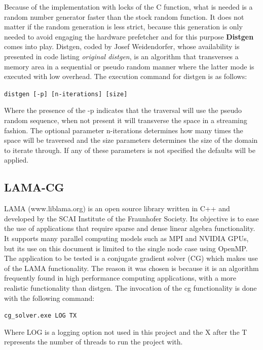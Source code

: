 Because of the implementation with locks of the C function, what is needed is a random number generator faster than the stock random function. It does not matter if the random generation is less strict, because this generation is only needed to avoid engaging the hardware prefetcher and for this purpose \textbf{Distgen} comes into play. Distgen, coded by Josef Weidendorfer, whose availability is presented in code listing \textit{original distgen}, is an algorithm that transverses a memory area in a sequential or pseudo random manner where the latter mode is executed with low overhead. The execution command for distgen is as follows:
\begin{center}
\texttt{distgen [-p] [n-iterations] [size]}
\end{center}

Where the presence of the -p indicates that the traversal will use the pseudo random sequence, when not present it will transverse the space in a streaming fashion. The optional parameter n-iterations determines how many times the space will be traversed and the size parameters determines the size of the domain to iterate through. If any of these parameters is not specified the defaults will be applied.

\subsection{LAMA-CG}\label{section:Lama}
LAMA (www.liblama.org) is an open source library written in C++ and developed by the SCAI Institute of the Fraunhofer Society. Its objective is to ease the use of applications that require sparse and dense linear algebra functionality. It supports many parallel computing models such as MPI and NVIDIA GPUs, but its use on this document is limited to the single node case using OpenMP. The application to be tested is a conjugate gradient solver (CG) which makes use of the LAMA functionality. The reason it was chosen is because it is an algorithm frequently found in high performance computing applications, with a more realistic functionality than distgen.
The invocation of the cg functionality is done with the following command:\\
\begin{center}
\texttt{cg\_solver.exe LOG TX}
\end{center}

Where LOG is a logging option not used in this project and the X after the T represents the number of threads to run the project with.

